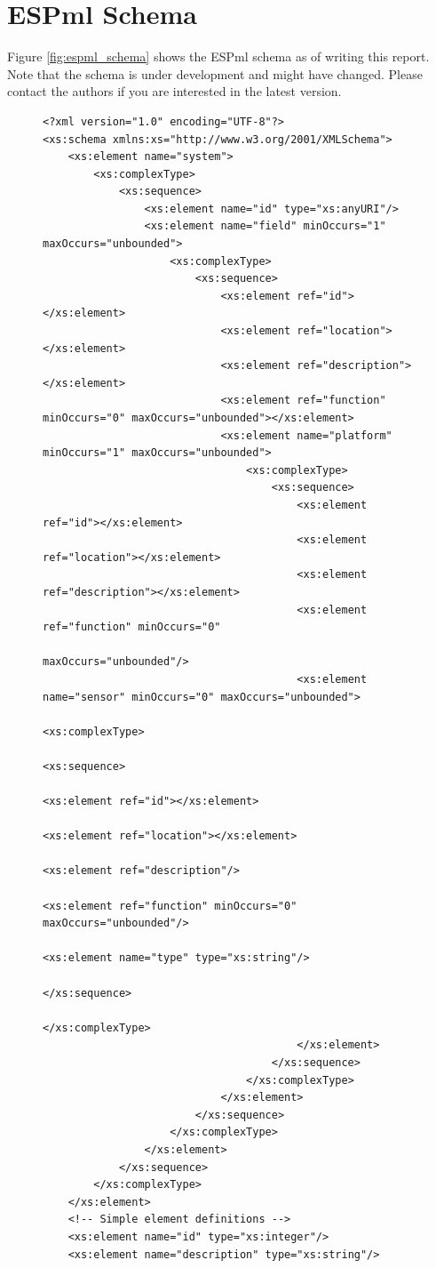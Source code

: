 \section{ESPml Schema}
Figure \ref{fig:espml_schema} shows the ESPml schema as of writing
this report. Note that the schema is under development and might have
changed. Please contact the authors if you are interested in
the latest version.

\begin{figure}[h]
\lstset{basicstyle=\tiny,breaklines=true}
\begin{lstlisting}
<?xml version="1.0" encoding="UTF-8"?>
<xs:schema xmlns:xs="http://www.w3.org/2001/XMLSchema">
    <xs:element name="system">
        <xs:complexType>
            <xs:sequence>
                <xs:element name="id" type="xs:anyURI"/>
                <xs:element name="field" minOccurs="1" maxOccurs="unbounded">
                    <xs:complexType>
                        <xs:sequence>
                            <xs:element ref="id"></xs:element>
                            <xs:element ref="location"></xs:element>
                            <xs:element ref="description"></xs:element>
                            <xs:element ref="function" minOccurs="0" maxOccurs="unbounded"></xs:element>
                            <xs:element name="platform" minOccurs="1" maxOccurs="unbounded">
                                <xs:complexType>
                                    <xs:sequence>
                                        <xs:element ref="id"></xs:element>
                                        <xs:element ref="location"></xs:element>
                                        <xs:element ref="description"></xs:element>
                                        <xs:element ref="function" minOccurs="0"
                                            maxOccurs="unbounded"/>
                                        <xs:element name="sensor" minOccurs="0" maxOccurs="unbounded">
                                            <xs:complexType>
                                                <xs:sequence>
                                                  <xs:element ref="id"></xs:element>
                                                  <xs:element ref="location"></xs:element>
                                                  <xs:element ref="description"/>
                                                  <xs:element ref="function" minOccurs="0" maxOccurs="unbounded"/>
                                                  <xs:element name="type" type="xs:string"/>
                                                </xs:sequence>
                                            </xs:complexType>
                                        </xs:element>
                                    </xs:sequence>
                                </xs:complexType>
                            </xs:element>
                        </xs:sequence>
                    </xs:complexType>
                </xs:element>
            </xs:sequence>
        </xs:complexType>
    </xs:element>
    <!-- Simple element definitions -->
    <xs:element name="id" type="xs:integer"/>
    <xs:element name="description" type="xs:string"/>


\end{lstlisting}
\end{figure}
